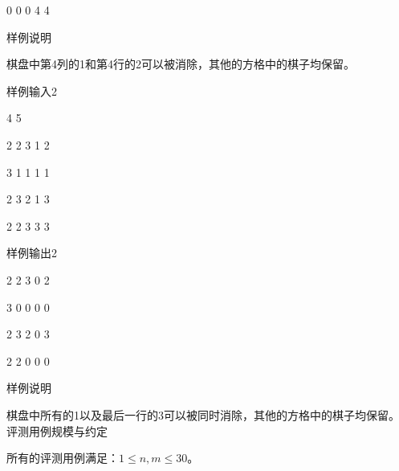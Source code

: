 0 0 0 4 4

样例说明

棋盘中第4列的1和第4行的2可以被消除，其他的方格中的棋子均保留。

样例输入2

4 5

2 2 3 1 2

3 1 1 1 1

2 3 2 1 3

2 2 3 3 3

样例输出2

2 2 3 0 2

3 0 0 0 0

2 3 2 0 3

2 2 0 0 0

样例说明

棋盘中所有的1以及最后一行的3可以被同时消除，其他的方格中的棋子均保留。
评测用例规模与约定

所有的评测用例满足：$1 \le n, m \le 30$。

